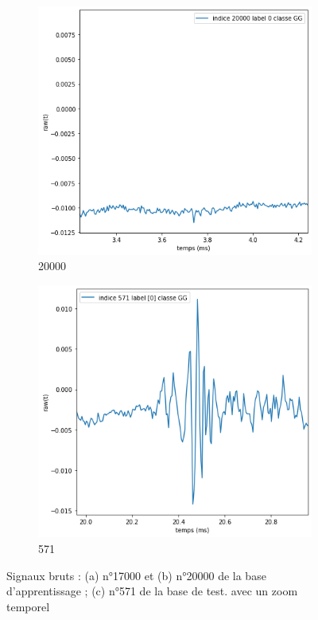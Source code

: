 \begin{figure}[!h]
\begin{subfigure}[b]{0.3\textwidth}
    \includegraphics[width=\textwidth]{./images/indice20000Spectro1Dlabel9classeZCsansprocessingaveczoom.png}
  \caption{20000}
  \end{subfigure}
  \begin{subfigure}[b]{0.3\textwidth}
    \includegraphics[width=\textwidth]{./images/indice571Spectro1Dlabel9classeZCsansprocessingaveczoom.png}
  \caption{571}
  \end{subfigure}
  \caption{Signaux bruts : (a) n°17000 et (b) n°20000 de la base d'apprentissage ; (c) n°571 de la base de test. avec un zoom temporel%
  \label{fig:signauxbrutszoom}}
\end{figure}

